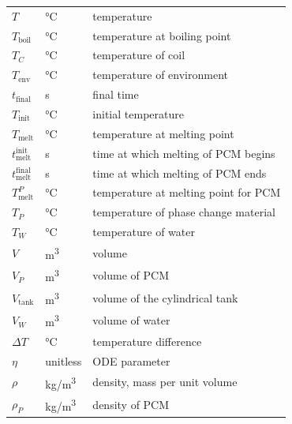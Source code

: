 \documentclass[12pt]{article}
\begin{document}
\begin{longtable*}{l l p{12cm}}
  $T$ & \si[per-mode=symbol] {\celsius} & temperature
  \\
  $T_\text{boil}$ & \si[per-mode=symbol] {\celsius} & temperature at boiling point
  \\
  $T_C$ &\si[per-mode=symbol] {\celsius} & temperature of coil
  \\
  $T_\text{env}$ & \si[per-mode=symbol] {\celsius} & temperature of environment
  \\ 
  $t_\text{final}$ & \si[per-mode=symbol] {\second} & final time
  \\ 
  $T_\text{init}$ & \si[per-mode=symbol] {\celsius} & initial temperature
  \\
  $T_\text{melt}$ & \si[per-mode=symbol] {\celsius} & temperature at melting point
  \\
  $t_\text{melt}^\text{init}$ & \si[per-mode=symbol] {\second} & time at which
                                                                 melting of PCM begins
  \\ 
  $t_\text{melt}^\text{final}$ & \si[per-mode=symbol] {\second} & time at which
                                                                 melting of PCM ends
  \\ 
  $T_\text{melt}^{P}$ & \si[per-mode=symbol] {\celsius} & temperature at melting
                                                          point for PCM
  \\
  $T_P$ & \si[per-mode=symbol] {\celsius} & temperature of phase change material
  \\
  $T_W$ & \si[per-mode=symbol] {\celsius} & temperature of water
  \\
  $V$ & \si[per-mode=symbol] {\cubic\metre} & volume
  \\
  $V_P$ & \si[per-mode=symbol] {\cubic\metre} & volume of PCM
  \\
  $V_\text{tank}$ & \si[per-mode=symbol] {\cubic\metre} & volume of the
  cylindrical tank
  \\
  $V_W$ & \si[per-mode=symbol] {\cubic\metre} & volume of water
  \\
  $\Delta T$ & \si[per-mode=symbol] {\celsius} & temperature difference
  \\
  $\eta$ & \si[per-mode=symbol] {unitless} & ODE parameter
  \\
  $\rho$ & \si[per-mode=symbol] {\kilogram\per\cubic\metre} & density, mass per
  unit volume
  \\
  $\rho_P$ & \si[per-mode=symbol] {\kilogram\per\cubic\metre} & density of PCM
  \\

\end{longtable*}
\end{document}
